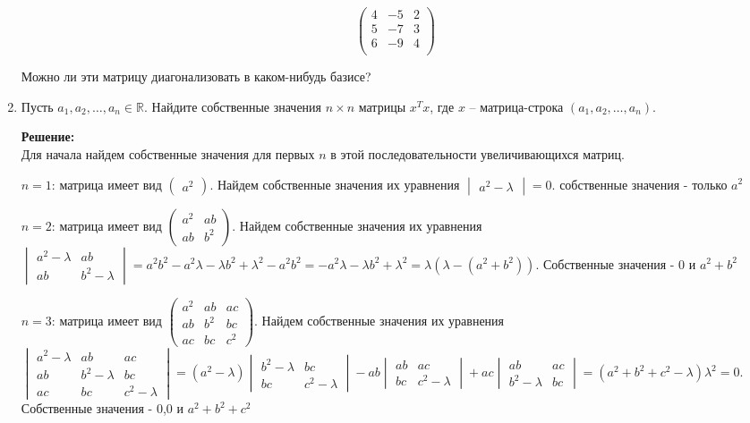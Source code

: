 \documentclass[a4paper,12pt]{article}
\begin{document}
\begin{enumerate}
$$
\begin{pmatrix}
{4}&{-5}&{2}\\
{5}&{-7}&{3}\\
{6}&{-9}&{4}\\
\end{pmatrix}
$$

Можно ли эти матрицу диагонализовать в каком-нибудь базисе?

\vspace{5pt}


\item Пусть $a_1, a_2, \dots, a_n \in \mathbb{R}$. Найдите собственные значения $n \times n$ матрицы $x^T x$, где $x$ -- матрица-строка $(a_1, a_2,\ldots,a_n)$.

\textbf{Решение:}\\
Для начала найдем собственные значения для первых $n$ в этой последовательности увеличивающихся матриц.

$n=1$: матрица имеет вид $
\begin{pmatrix}
a^2
\end{pmatrix}
$. Найдем собственные значения их уравнения $\begin{vmatrix}
a^2-\lambda
\end{vmatrix} =0$. собственные значения - только $a^2$

$n=2$: матрица имеет вид $
\begin{pmatrix}
a^2&ab\\
ab&b^2
\end{pmatrix}
$. Найдем собственные значения их уравнения $\begin{vmatrix}
a^2-\lambda&ab\\
ab&b^2-\lambda
\end{vmatrix} =a^2b^2-a^2\lambda-{\lambda} b^2 + \lambda^2 -a^2b^2=-a^2\lambda-{\lambda} b^2 + \lambda^2=\lambda(\lambda-(a^2+b^2))$. Собственные значения - 0 и $a^2+b^2$

$n=3$: матрица имеет вид $
\begin{pmatrix}
a^2&ab&ac\\
ab&b^2&bc\\
ac&bc&c^2
\end{pmatrix}
$. Найдем собственные значения их уравнения $\begin{vmatrix}
a^2-\lambda&ab&ac\\
ab&b^2-\lambda&bc\\
ac&bc&c^2-\lambda
\end{vmatrix} =(a^2-\lambda)\begin{vmatrix}
b^2-\lambda&bc\\
bc&c^2-\lambda
\end{vmatrix}-ab\begin{vmatrix}
ab&ac\\
bc&c^2-\lambda
\end{vmatrix}+ac\begin{vmatrix}
ab&ac\\
b^2-\lambda&bc
\end{vmatrix}=(a^2 + b^2 + c^2 - \lambda) \lambda^2=0$. Собственные значения - 0,0 и $a^2 + b^2 + c^2$


\end{enumerate}
\end{document}
